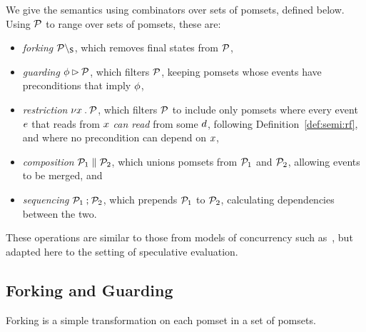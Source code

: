 We give the semantics using combinators over sets of pomsets, defined below.
Using $\mathcal{P}$ to range over sets of pomsets, these are:
\begin{itemize}
\item \emph{forking} $\mathcal{P}\setminus_{\mathsf{S}}$, which removes final states from
  $\mathcal{P}$, 
\item \emph{guarding} $\phi\mathbin\rhd\mathcal{P}$, which filters $\mathcal{P}$,
  keeping pomsets whose events have preconditions that imply $\phi$,
\item \emph{restriction} $\nu x\mathbin.\mathcal{P}$, which filters $\mathcal{P}$ to include
  only pomsets where every event $e$ that reads from $x$ \emph{can read} from some
  $d$, following Definition~\ref{def:semi:rf},
  and where no precondition can depend on $x$,
\item \emph{composition} $\mathcal{P}_1\parallel\mathcal{P}_2$, which unions pomsets from
  $\mathcal{P}_1$ and $\mathcal{P}_2$, allowing events to be merged, and
\item \emph{sequencing} $\mathcal{P}_1\mathbin;\mathcal{P}_2$, which prepends
  $\mathcal{P}_1$ to $\mathcal{P}_2$, calculating dependencies between the two.
\end{itemize}
These operations are similar to those from models of concurrency such
as~\cite{Brookes:1984:TCS:828.833}, but adapted here to the setting of
speculative evaluation.



\subsection{Forking and Guarding} %

Forking is %
a simple transformation on each pomset
in a set of pomsets.

